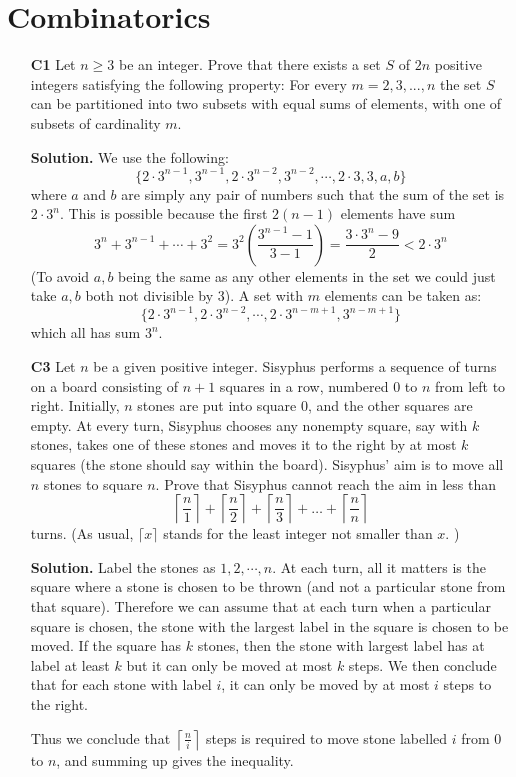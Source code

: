 \documentclass[11pt,a4paper]{article}
\begin{document}
\section*{Combinatorics}
\begin{enumerate}
	\item[\textbf{C1}] Let $n\geqslant 3$ be an integer. Prove that there exists a set $S$ of $2n$ positive integers satisfying the following property: For every $m=2,3,...,n$ the set $S$ can be partitioned into two subsets with equal sums of elements, with one of subsets of cardinality $m$.
	
	\textbf{Solution.} 
	We use the following: 
	\[
	\{2\cdot 3^{n-1}, 3^{n-1}, 2\cdot 3^{n-2}, 3^{n-2}, \cdots , 2\cdot 3, 3, a, b\}
	\]
	where $a$ and $b$ are simply any pair of numbers such that the sum of the set is $2\cdot 3^n$. This is possible because the first $2(n-1)$ elements have sum 
	\[
	3^n+3^{n-1}+\cdots + 3^2 = 3^2(\frac{3^{n-1}-1}{3-1})=\frac{3\cdot 3^{n}-9}{2}<2\cdot 3^n
	\]
	(To avoid $a, b$ being the same as any other elements in the set we could just take $a, b$ both not divisible by 3). 
	A set with $m$ elements can be taken as: 
	\[
	\{2\cdot 3^{n-1}, 2\cdot 3^{n-2}, \cdots , 2\cdot 3^{n-m+1}, 3^{n-m+1}\}
	\]
	which all has sum $3^n$. 
	
	\item[\textbf{C3}]Let $n$ be a given positive integer. Sisyphus performs a sequence of turns on a board consisting of $n + 1$ squares in a row, numbered $0$ to $n$ from left to right. Initially, $n$ stones are put into square $0$, and the other squares are empty. At every turn, Sisyphus chooses any nonempty square, say with $k$ stones, takes one of these stones and moves it to the right by at most $k$ squares (the stone should say within the board). Sisyphus' aim is to move all $n$ stones to square $n$.
	Prove that Sisyphus cannot reach the aim in less than
	\[ \left \lceil \frac{n}{1} \right \rceil + \left \lceil \frac{n}{2} \right \rceil + \left \lceil \frac{n}{3} \right \rceil + \dots + \left \lceil \frac{n}{n} \right \rceil \]turns. (As usual, $\lceil x \rceil$ stands for the least integer not smaller than $x$. )
	
	\textbf{Solution.} Label the stones as $1, 2, \cdots , n$. At each turn, all it matters is the square where a stone is chosen to be thrown (and not a particular stone from that square). 
	Therefore we can assume that at each turn when a particular square is chosen, the stone with the largest label in the square is chosen to be moved. If the square has $k$ stones, then the stone with largest label has at label at least $k$ but it can only be moved at most $k$ steps. We then conclude that for each stone with label $i$, it can only be moved by at most $i$ steps to the right. 
	
	Thus we conclude that $ \left \lceil \frac{n}{i} \right \rceil$ steps is required to move stone labelled $i$ from 0 to $n$, and summing up gives the inequality. 
\end{enumerate}
\end{document}
